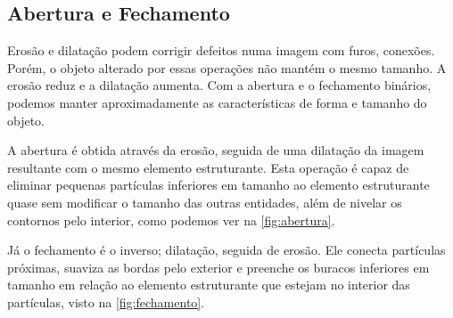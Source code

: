 \subsection{Abertura e Fechamento}

Erosão e dilatação podem corrigir defeitos numa imagem com furos, conexões. Porém, o objeto alterado por essas operações não mantém o mesmo tamanho. A erosão reduz e a dilatação aumenta. Com a abertura e o fechamento binários, podemos manter aproximadamente as características de forma e tamanho do objeto.

A abertura é obtida através da erosão, seguida de uma dilatação da imagem resultante com o mesmo elemento estruturante. Esta operação é capaz de eliminar pequenas partículas inferiores em tamanho ao elemento estruturante quase sem modificar o tamanho das outras entidades, além de nivelar os contornos pelo interior, como podemos ver na \ref{fig:abertura}.

Já o fechamento é o inverso; dilatação, seguida de erosão. Ele conecta partículas próximas, suaviza as bordas pelo exterior e preenche os buracos inferiores em tamanho em relação ao elemento estruturante que estejam no interior das partículas, visto na \ref{fig:fechamento}.

